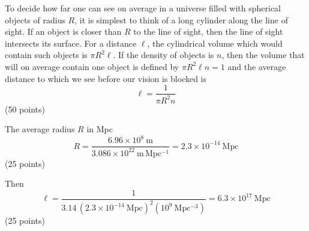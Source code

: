 To decide how far one can see on average in a universe filled with spherical
objects of radius $R$, it is simplest to think of a long cylinder along the
line of sight. If an object is closer than $R$ to the line of sight, then the
line of sight intersects its surface. For a distance $\ell$, the cylindrical
volume which would contain such objects is $\pi R^2\ell$. If the density of
objects is $n$, then the volume that will on average contain one object is
defined by $\pi R^2\ell n = 1$ and the average distance to which we see
before our vision is blocked is
\[
\ell = \frac{1}{\pi R^2 n}
\]
\hfill(50 points)

The average radius $R$ in Mpc
\[
R = \frac{6.96\times10^{8}\ \mathrm{m}}
  {3.086\times10^{22}\ \mathrm{m\,Mpc^{-1}}}
= 2.3\times10^{-14}\ \mathrm{Mpc}
\]
\hfill(25 points)

Then
\[
\ell = \frac{1}
  {3.14\,(2.3\times10^{-14}\ \mathrm{Mpc})^2 (10^{9}\ \mathrm{Mpc^{-3}})}
= 6.3\times10^{17}\ \mathrm{Mpc}
\]
\hfill(25 points)
